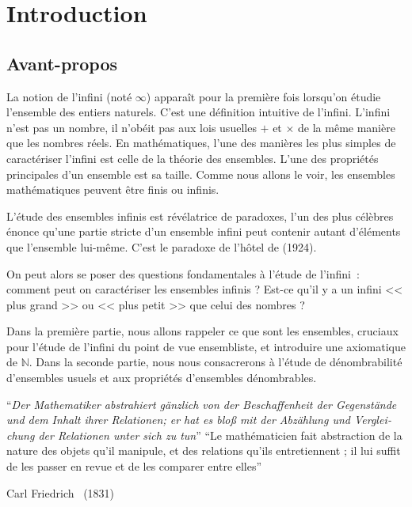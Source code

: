 \documentclass[a4paper,french,final]{memoir}
\begin{document}
\begin{titlingpage}

\end{titlingpage}

\frontmatter
\tableofcontents
\part{Introduction}
\chapter{Avant-propos}
La notion de l'infini (noté $\infty$) apparaît pour la première fois lorsqu'on étudie l'ensemble des entiers naturels. C'est une définition intuitive de l'infini. L'infini n'est pas un nombre, il n'obéit pas aux lois usuelles $+$ et $\times$ de la même manière que les nombres réels. En mathématiques, l'une des manières les plus simples de caractériser l'infini est celle de la théorie des ensembles. L'une des propriétés principales d'un ensemble est sa taille. Comme nous allons le voir, les ensembles mathématiques peuvent être finis ou infinis.

L'étude des ensembles infinis est révélatrice de paradoxes, l'un des plus célèbres  énonce qu'une partie stricte d'un ensemble infini peut contenir autant d'éléments que l'ensemble lui-même. C'est le paradoxe de l'hôtel de  (1924).

On peut alors se poser des questions fondamentales à l'étude de l'infini~: comment peut on caractériser les ensembles infinis ? Est-ce qu'il y a un infini << plus grand >> ou << plus petit >> que celui des nombres ?  

Dans la première partie, nous allons rappeler ce que sont les ensembles, cruciaux pour l'étude de l'infini du point de vue ensembliste, et introduire une axiomatique de $\mathbb{N}$. 
Dans la seconde partie, nous nous consacrerons à l'étude de dénombrabilité d'ensembles usuels et aux propriétés d'ensembles dénombrables.

\epigraph{%
	\foreignlanguage{german}{\enquote{\itshape Der Mathematiker abstrahiert gänzlich von der Beschaffenheit der Gegenstände und dem Inhalt ihrer Relationen; er hat es bloß mit der Abzählung und Vergleichung der Relationen unter sich zu tun}}\newline \newline
\enquote{Le mathématicien fait abstraction de la nature des objets qu'il manipule, et des relations qu'ils entretiennent ; il lui suffit de les passer en revue et de les comparer entre elles}
}{Carl Friedrich \footnotemark~(1831)}
\mainmatter
\end{document}
